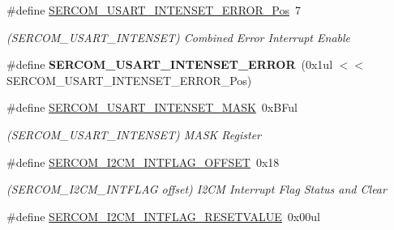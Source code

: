 \begin{DoxyCompactItemize}
\item 
\hypertarget{group___s_a_m_l21___s_e_r_c_o_m_gaef6c1262e70469028f07779e3f71754d}{}\#define \hyperlink{group___s_a_m_l21___s_e_r_c_o_m_gaef6c1262e70469028f07779e3f71754d}{S\+E\+R\+C\+O\+M\+\_\+\+U\+S\+A\+R\+T\+\_\+\+I\+N\+T\+E\+N\+S\+E\+T\+\_\+\+E\+R\+R\+O\+R\+\_\+\+Pos}~7\label{group___s_a_m_l21___s_e_r_c_o_m_gaef6c1262e70469028f07779e3f71754d}

\begin{DoxyCompactList}\small\item\em (S\+E\+R\+C\+O\+M\+\_\+\+U\+S\+A\+R\+T\+\_\+\+I\+N\+T\+E\+N\+S\+E\+T) Combined Error Interrupt Enable \end{DoxyCompactList}\item 
\hypertarget{group___s_a_m_l21___s_e_r_c_o_m_ga5878d3d68ac0211589a65a2f557b6a0d}{}\#define {\bfseries S\+E\+R\+C\+O\+M\+\_\+\+U\+S\+A\+R\+T\+\_\+\+I\+N\+T\+E\+N\+S\+E\+T\+\_\+\+E\+R\+R\+O\+R}~(0x1ul $<$$<$ S\+E\+R\+C\+O\+M\+\_\+\+U\+S\+A\+R\+T\+\_\+\+I\+N\+T\+E\+N\+S\+E\+T\+\_\+\+E\+R\+R\+O\+R\+\_\+\+Pos)\label{group___s_a_m_l21___s_e_r_c_o_m_ga5878d3d68ac0211589a65a2f557b6a0d}

\item 
\hypertarget{group___s_a_m_l21___s_e_r_c_o_m_ga34a79d4eb6357ca5629b75ea0b1a1f38}{}\#define \hyperlink{group___s_a_m_l21___s_e_r_c_o_m_ga34a79d4eb6357ca5629b75ea0b1a1f38}{S\+E\+R\+C\+O\+M\+\_\+\+U\+S\+A\+R\+T\+\_\+\+I\+N\+T\+E\+N\+S\+E\+T\+\_\+\+M\+A\+S\+K}~0x\+B\+Ful\label{group___s_a_m_l21___s_e_r_c_o_m_ga34a79d4eb6357ca5629b75ea0b1a1f38}

\begin{DoxyCompactList}\small\item\em (S\+E\+R\+C\+O\+M\+\_\+\+U\+S\+A\+R\+T\+\_\+\+I\+N\+T\+E\+N\+S\+E\+T) M\+A\+S\+K Register \end{DoxyCompactList}\item 
\hypertarget{group___s_a_m_l21___s_e_r_c_o_m_ga502e9cb22a90fa745b7d4eea15d06101}{}\#define \hyperlink{group___s_a_m_l21___s_e_r_c_o_m_ga502e9cb22a90fa745b7d4eea15d06101}{S\+E\+R\+C\+O\+M\+\_\+\+I2\+C\+M\+\_\+\+I\+N\+T\+F\+L\+A\+G\+\_\+\+O\+F\+F\+S\+E\+T}~0x18\label{group___s_a_m_l21___s_e_r_c_o_m_ga502e9cb22a90fa745b7d4eea15d06101}

\begin{DoxyCompactList}\small\item\em (S\+E\+R\+C\+O\+M\+\_\+\+I2\+C\+M\+\_\+\+I\+N\+T\+F\+L\+A\+G offset) I2\+C\+M Interrupt Flag Status and Clear \end{DoxyCompactList}\item 
\hypertarget{group___s_a_m_l21___s_e_r_c_o_m_ga2a783802c4e63acfff748aaff1eb7efe}{}\#define \hyperlink{group___s_a_m_l21___s_e_r_c_o_m_ga2a783802c4e63acfff748aaff1eb7efe}{S\+E\+R\+C\+O\+M\+\_\+\+I2\+C\+M\+\_\+\+I\+N\+T\+F\+L\+A\+G\+\_\+\+R\+E\+S\+E\+T\+V\+A\+L\+U\+E}~0x00ul\label{group___s_a_m_l21___s_e_r_c_o_m_ga2a783802c4e63acfff748aaff1eb7efe}


\end{DoxyCompactItemize}
